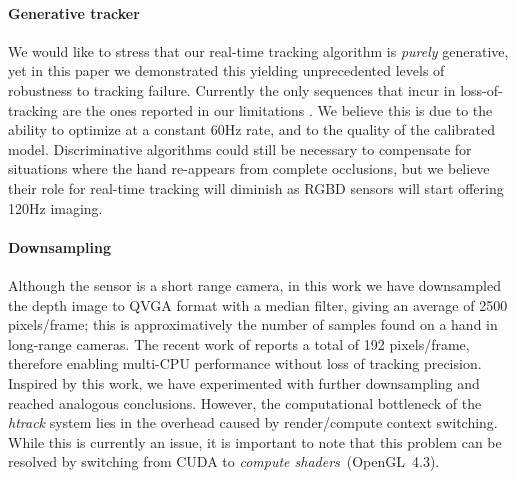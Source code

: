 \paragraph{Generative tracker}
We would like to stress that our real-time tracking algorithm is \emph{purely} generative, yet in this paper we demonstrated this yielding unprecedented levels of robustness to tracking failure. Currently the only sequences that incur in loss-of-tracking are the ones reported in our limitations \VideoLimitations{}. We believe this is due to the ability to optimize at a constant 60Hz rate, and to the quality of the calibrated model. Discriminative algorithms could still be necessary to compensate for situations where the hand re-appears from complete occlusions, but we believe their role for real-time tracking will diminish as RGBD sensors will start offering 120Hz imaging.  

\paragraph{Downsampling}
Although the \realsense{} sensor is a short range camera, in this work we have downsampled the depth image to QVGA format with a median filter, giving an average of 2500 pixels/frame; this is approximatively the number of samples found on a hand in long-range cameras. The recent work of \cite{taylor2016concerto} reports a total of 192 pixels/frame, therefore enabling multi-CPU performance without loss of tracking precision. Inspired by this work, we have experimented with further downsampling and reached analogous conclusions. However, the computational bottleneck of the \emph{htrack} system lies in the overhead caused by render/compute context switching. While this is currently an issue, it is important to note that this problem can be resolved by switching from CUDA to  \emph{compute shaders}~(OpenGL~4.3).

